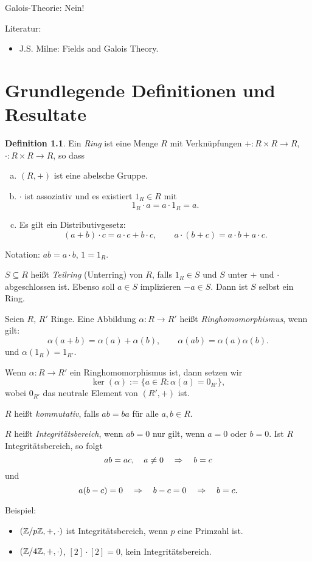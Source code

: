 \documentclass[
 a4paper,
 12pt,
 parskip=half
 ]{scrreprt}
\theoremstyle{plain}
\theoremstyle{definition}
\newtheorem{defn}[thm]{Definition}
\numberwithin{equation}{chapter}
\numberwithin{thm}{chapter}
\begin{document}
Galois-Theorie: Nein!

Literatur:
\begin{itemize}
\item J.S. Milne: Fields and Galois Theory.
\end{itemize}

\chapter{Grundlegende Definitionen und Resultate}
\begin{defn}
  Ein \emph{Ring} ist eine Menge $R$ mit Verknüpfungen $+: R \times R \to
  R$, $\cdot: R \times R \to R$, so dass
  \begin{enumerate}[a)]
  \item $(R,+)$ ist eine abelsche Gruppe.
  \item $\cdot$ ist assoziativ und es existiert $1_R \in R$ mit
    \[ 1_R \cdot a = a \cdot 1_R = a. \]
  \item Es gilt ein Distributivgesetz:
    \[ (a+b) \cdot c = a \cdot c + b \cdot c, \qquad
      a \cdot (b+c) = a \cdot b + a \cdot c. \]
  \end{enumerate}
  Notation: $ab = a \cdot b$, $1 = 1_R$.

  $S \subseteq R$ heißt \emph{Teilring} (Unterring) von $R$, falls $1_R \in S$
  und $S$ unter $+$ und $\cdot$ abgeschlossen ist. Ebenso soll $a \in S$
  implizieren $-a \in S$. Dann ist $S$ selbst ein Ring.

  Seien $R$, $R'$ Ringe. Eine Abbildung $\alpha: R \to R'$ heißt
  \emph{Ringhomomorphismus}, wenn gilt:
  \[ \alpha( a+b ) = \alpha(a) + \alpha(b), \qquad
    \alpha( ab ) = \alpha(a) \alpha(b). \]
  und $\alpha( 1_R ) = 1_{R'}$.

  Wenn $\alpha: R \to R'$ ein Ringhomomorphismus ist, dann setzen wir
  \[ \ker(\alpha) := \{ a \in R : \alpha(a) = 0_{R'} \}, \]
  wobei $0_{R'}$ das neutrale Element von $(R',+)$ ist.

  $R$ heißt \emph{kommutativ}, falls $ab = ba$ für alle $a, b \in R$.

  $R$ heißt \emph{Integritätsbereich}, wenn $ab = 0$ nur gilt, wenn $a = 0$ oder
  $b = 0$. Ist $R$ Integritätsbereich, so folgt
  \[ ab = ac, \quad a \ne 0 \quad \Rightarrow \quad b = c \]
  und
  \[ a(b-c) = 0 \quad \Rightarrow \quad b -c = 0 \quad \Rightarrow \quad b = c. \]

  Beispiel:
  \begin{itemize}
  \item $(\mathbb{Z} / p \mathbb{Z}, +, \cdot)$ ist Integritätsbereich, wenn $p$ eine Primzahl
    ist.
  \item $(\mathbb{Z} / 4 \mathbb{Z}, +, \cdot)$, $[2] \cdot [2] = 0$, kein Integritätsbereich.
  \end{itemize}
  

\end{defn}
\end{document}
